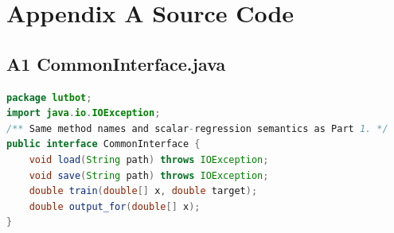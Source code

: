 \documentclass[11pt,letterpaper]{article}
\begin{document}
\newpage
\appendix
{}
\section*{Appendix A Source Code}
\subsection*{A1 CommonInterface.java}
\begin{lstlisting}[language=Java]
package lutbot;
import java.io.IOException;
/** Same method names and scalar-regression semantics as Part 1. */
public interface CommonInterface {
    void load(String path) throws IOException;
    void save(String path) throws IOException;
    double train(double[] x, double target);
    double output_for(double[] x);
}
\end{lstlisting}
\end{document}
